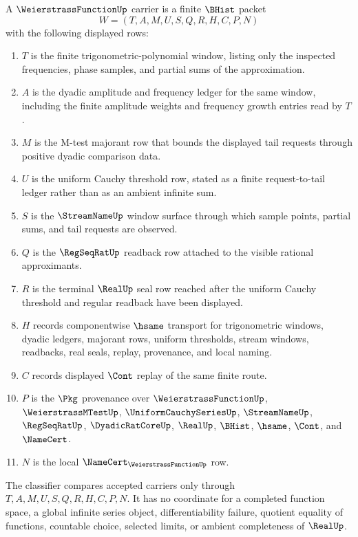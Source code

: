 \begin{definition}
\label{def:weierstrass-function-carrier}
A $\WeierstrassFunctionUp$ carrier is a finite $\BHist$ packet
$$
W=(T,A,M,U,S,Q,R,H,C,P,N)
$$
with the following displayed rows:
\begin{enumerate}
\item $T$ is the finite trigonometric-polynomial window, listing only the inspected frequencies, phase samples, and partial sums of the approximation.
\item $A$ is the dyadic amplitude and frequency ledger for the same window, including the finite amplitude weights and frequency growth entries read by $T$.
\item $M$ is the M-test majorant row that bounds the displayed tail requests through positive dyadic comparison data.
\item $U$ is the uniform Cauchy threshold row, stated as a finite request-to-tail ledger rather than as an ambient infinite sum.
\item $S$ is the $\StreamNameUp$ window surface through which sample points, partial sums, and tail requests are observed.
\item $Q$ is the $\RegSeqRatUp$ readback row attached to the visible rational approximants.
\item $R$ is the terminal $\RealUp$ seal row reached after the uniform Cauchy threshold and regular readback have been displayed.
\item $H$ records componentwise $\hsame$ transport for trigonometric windows, dyadic ledgers, majorant rows, uniform thresholds, stream windows, readbacks, real seals, replay, provenance, and local naming.
\item $C$ records displayed $\Cont$ replay of the same finite route.
\item $P$ is the $\Pkg$ provenance over $\WeierstrassFunctionUp$, $\WeierstrassMTestUp$, $\UniformCauchySeriesUp$, $\StreamNameUp$, $\RegSeqRatUp$, $\DyadicRatCoreUp$, $\RealUp$, $\BHist$, $\hsame$, $\Cont$, and $\NameCert$.
\item $N$ is the local $\NameCert_{\WeierstrassFunctionUp}$ row.
\end{enumerate}
The classifier compares accepted carriers only through $T,A,M,U,S,Q,R,H,C,P,N$. It has no coordinate for a completed function space, a global infinite series object, differentiability failure, quotient equality of functions, countable choice, selected limits, or ambient completeness of $\RealUp$.
\end{definition}

